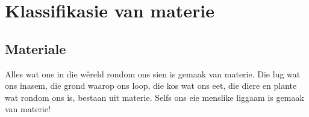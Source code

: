          \chapter{Klassifikasie van materie}\label{chap:classification}
    \setcounter{figure}{1}
    \setcounter{subfigure}{1}
    \label{m38708*cid1}
\section{Materiale}
\nopagebreak

Alles wat ons in die w\^ereld rondom ons sien is gemaak van materie. Die lug wat ons inasem, die grond waarop ons loop, die kos wat ons eet, die diere en plante wat rondom ons is, bestaan uit materie. Selfs ons eie menslike liggaam is gemaak van materie!\par 
            

